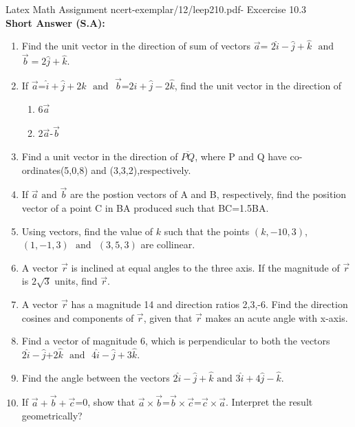 \documentclass{article}
\begin{document}
Latex Math Assignment ncert-exemplar/12/leep210.pdf- Excercise 10.3\\
\textbf{Short Answer (S.A):}

\begin{enumerate}
\item Find the unit vector in the direction of sum of vectors $\vec{a}$= $2\hat{i}-\hat{j}+\hat{k}$ $\text{ and }$ $\vec{b}=2\hat{j}+\hat{k}$.

\item If $\vec{a}$=$\hat{i}+\hat{j}+2\hat{k}$ $\text{ and }$ $\vec{b}$=$2\hat{i}+\hat{j}-2\hat{k}$, find the unit vector in the direction of
	\begin{enumerate}
		\item 6$\vec{a}$   
		\item 2$\vec{a}$-$\vec{b}$
	\end{enumerate}

\item Find a unit vector in the direction of $\overline{PQ} $, where P and Q have co-ordinates(5,0,8) and (3,3,2),respectively.

\item If $\vec{a}$ $\text{and}$ $\vec{b}$ are the postion vectors of A and B, respectively, find the position vector of a point C in BA produced such that BC=1.5BA.

\item Using vectors, find the value of $k$ such that the points $(k,-10,3)$, $(1,-1,3)$ $\text{ and }$ $(3,5,3)$ are collinear.

\item A vector $\vec{r}$ is inclined at equal angles to the three axis. If the magnitude of $\vec{r}$ is $2\sqrt{3}$ units, find $\vec{r}$.


\item A vector $\vec{r}$ has a magnitude 14 and direction ratios 2,3,-6. Find the direction cosines and components of $\vec{r}$, given that $\vec{r}$ makes an acute angle with x-axis.


\item Find a vector of magnitude 6, which is perpendicular to both the vectors $2\hat{i}-\hat{j}$+$2\hat{k}$ $\text{ and }$ $4\hat{i}-\hat{j}+3\hat{k}$.


\item Find the angle between the vectors $2\hat{i}-\hat{j}+\hat{k}$ $\text{and}$ $3\hat{i}+4\hat{j}-\hat{k}$.


\item If $\vec{a}+\vec{b}+\vec{c}$=0, show that $\vec{a}\times\vec{b}$=$\vec{b}\times\vec{c}$=$\vec{c}\times\vec{a}$. Interpret the result geometrically?




\end{enumerate}
\end{document}
